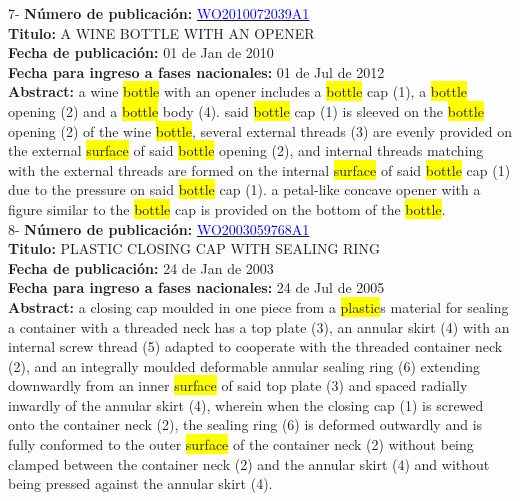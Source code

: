  \vspace{1cm}7- \textbf{Número de publicación:} \href{https://worldwide.espacenet.com/publicationDetails/biblio?DB=EPODOC&II=0&ND=3&adjacent=true&locale=en_EP&FT=D&date=20160331&CC=WO&NR=2010072039A1&KC=A1#}{\textcolor{blue}{WO2010072039A1}}\\ 
\textbf{Titulo:} A WINE BOTTLE WITH AN OPENER\\ 
 
\textbf{Fecha de publicación:} 01 de Jan de 2010\\ 
\textbf{Fecha para ingreso a fases nacionales:} 01 de Jul de 2012\\ 
\textbf{Abstract:} a wine \colorbox{yellow}{bottle} with an opener includes a \colorbox{yellow}{bottle} cap (1), a \colorbox{yellow}{bottle} opening (2) and a \colorbox{yellow}{bottle} body (4). said \colorbox{yellow}{bottle} cap (1) is sleeved on the \colorbox{yellow}{bottle} opening (2) of the wine \colorbox{yellow}{bottle}, several external threads (3) are evenly provided on the external \colorbox{yellow}{surface} of said \colorbox{yellow}{bottle} opening (2), and internal threads matching with the external threads are formed on the internal \colorbox{yellow}{surface} of said \colorbox{yellow}{bottle} cap (1) due to the pressure on said \colorbox{yellow}{bottle} cap (1). a petal-like concave opener with a figure similar to the \colorbox{yellow}{bottle} cap is provided on the bottom of the \colorbox{yellow}{bottle}.\\ 
 

 \vspace{1cm}8- \textbf{Número de publicación:} \href{https://worldwide.espacenet.com/publicationDetails/biblio?DB=EPODOC&II=0&ND=3&adjacent=true&locale=en_EP&FT=D&date=20160331&CC=WO&NR=2003059768A1&KC=A1#}{\textcolor{blue}{WO2003059768A1}}\\ 
\textbf{Titulo:} PLASTIC CLOSING CAP WITH SEALING RING\\ 
 
\textbf{Fecha de publicación:} 24 de Jan de 2003\\ 
\textbf{Fecha para ingreso a fases nacionales:} 24 de Jul de 2005\\ 
\textbf{Abstract:} a closing cap moulded in one piece from a \colorbox{yellow}{plastic}s material for sealing a container with a threaded neck has a top plate (3), an annular skirt (4) with an internal screw thread (5) adapted to cooperate with the threaded container neck (2), and an integrally moulded deformable annular sealing ring (6) extending downwardly from an inner \colorbox{yellow}{surface} of said top plate (3) and spaced radially inwardly of the annular skirt (4), wherein when the closing cap (1) is screwed onto the container neck (2), the sealing ring (6) is deformed outwardly and is fully conformed to the outer \colorbox{yellow}{surface} of the container neck (2) without being clamped between the container neck (2) and the annular skirt (4) and without being pressed against the annular skirt (4).\\ 
 

